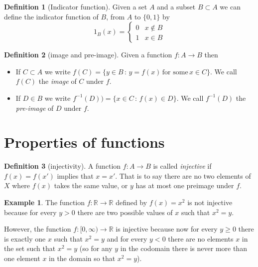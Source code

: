 \documentclass[
]{book}
\theoremstyle{definition}
\newtheorem{definition}{Definition}[chapter]
\theoremstyle{definition}
\newtheorem{example}{Example}[chapter]
\theoremstyle{definition}
\theoremstyle{definition}
\theoremstyle{remark}
\begin{document}
\begin{definition}[Indicator function]
Given a set \(A\) and a subset \(B \subset A\) we can define the indicator function of \(B\), from \(A\) to \(\{0,1\}\) by
\[ 1_B(x) = \left\{\begin{array}{cc} 0 & x \not\in B\\ 1 & x \in B \end{array} \right. \]
\end{definition}

\begin{definition}[image and pre-image]

Given a function \(f:A \rightarrow B\) then

\begin{itemize}
\item
  If \(C \subset A\) we write \(f(C) = \{y \in B \,:\, y = f(x) \, \mbox{for some} \, x \in C\}\). We call \(f(C)\) the \emph{image} of \(C\) under \(f\).
\item
  If \(D \in B\) we write \(f^{-1}(D)) = \{ x \in C \,:\, f(x) \in D\}\). We call \(f^{-1}(D)\) the \emph{pre-image} of \(D\) under \(f\).
\end{itemize}

\end{definition}

\section{Properties of functions}\label{properties-of-functions}

\begin{definition}[injectivity]
A function \(f:A\rightarrow B\) is called \emph{injective} if \(f(x)=f(x')\) implies that \(x=x'\). That is to say there are no two elements of \(X\) where \(f(x)\) takes the same value, or \(y\) has at most one preimage under \(f\).
\end{definition}

\begin{example}
The function \(f: \mathbb{R} \rightarrow \mathbb{R}\) defined by \(f(x) =x^2\) is not injective because for every \(y>0\) there are two possible values of \(x\) such that \(x^2 = y\).

However, the function \(f: [0, \infty) \rightarrow \mathbb{R}\) is injective because now for every \(y\geq 0\) there is exactly one \(x\) such that \(x^2=y\) and for every \(y <0\) there are no elements \(x\) in the set such that \(x^2 = y\) (so for any \(y\) in the codomain there is never more than one element \(x\) in the domain so that \(x^2 = y\)).
\end{example}
\end{document}
